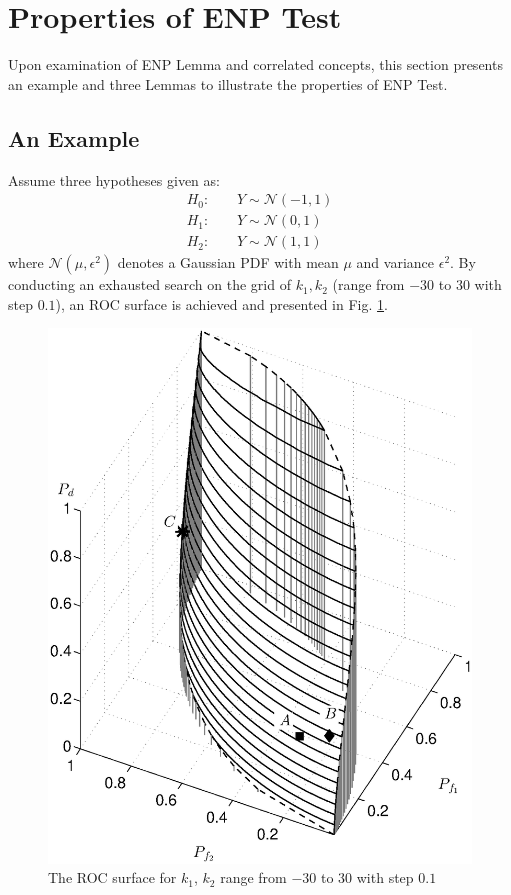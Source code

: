 
\section{Properties of ENP Test}
Upon examination of ENP Lemma and correlated concepts, this section presents an example and three Lemmas to illustrate the properties of ENP Test. 

\subsection{An Example}
Assume three hypotheses given as:
\begin{equation}
\begin{split}
H_0:\;\;\;\;&Y \sim \mathcal{N}(-1, 1)\\
H_1:\;\;\;\;&Y \sim \mathcal{N}(0, 1)\\
H_2:\;\;\;\;&Y \sim \mathcal{N}(1, 1)
\end{split}
\end{equation}
where $\mathcal{N}(\mu, \epsilon^2)$ denotes a Gaussian PDF with mean $\mu$ and variance $\epsilon^2$. By conducting an exhausted search on the grid of $k_1, k_2$ (range from $-30$ to $30$ with step $0.1$), an ROC surface is achieved  and presented in Fig. \ref{fig: 2.1}. 

\begin{figure}[!hbp]
\centering
\includegraphics[width = \textwidth]{2/c21.eps}
\caption{The ROC surface for $k_1$, $k_2$ range from $-30$ to $30$ with step $0.1$}
\label{fig: 2.1}
\end{figure}

